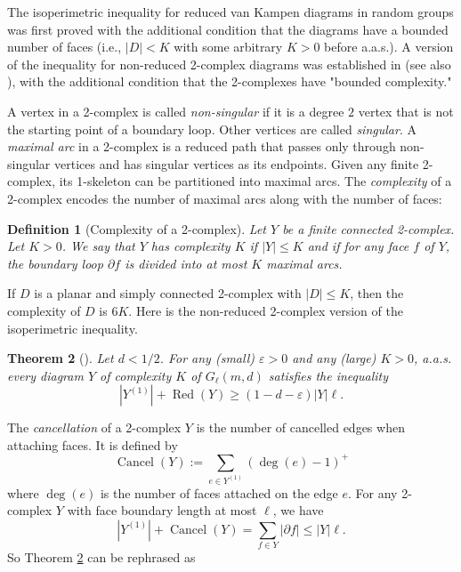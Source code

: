 \documentclass[a4paper]{article}
\DeclareMathOperator{\Red}{Red}
\DeclareMathOperator{\Cancel}{Cancel}
\DeclareMathOperator{\degg}{deg}
\newtheorem{thm}{Theorem}[section]
\newtheorem{defi}[thm]{Definition}
\theoremstyle{remark}
\begin{document}
\quad

The isoperimetric inequality for reduced van Kampen diagrams in random groups was first proved with the additional condition that the diagrams have a bounded number of faces (i.e., $|D|<K$ with some arbitrary $K>0$ before a.a.s.). A version of the inequality for non-reduced 2-complex diagrams was established in \cite{Tsa22b} (see also \cite{GM18}), with the additional condition that the 2-complexes have "bounded complexity."

A vertex in a 2-complex is called \textit{non-singular} if it is a degree $2$ vertex that is not the starting point of a boundary loop. Other vertices are called \textit{singular}. A \textit{maximal arc} in a 2-complex is a reduced path that passes only through non-singular vertices and has singular vertices as its endpoints. Given any finite 2-complex, its 1-skeleton can be partitioned into maximal arcs. The \textit{complexity} of a 2-complex encodes the number of maximal arcs along with the number of faces:

\begin{defi}[Complexity of a 2-complex]\label{complexity}
Let $Y$ be a finite connected 2-complex. Let $K>0$. We say that $Y$ has complexity $K$ if $|Y|\leq K$ and if for any face $f$ of $Y$, the boundary loop $\partial f$ is divided into at most $K$ maximal arcs.
\end{defi}


If $D$ is a planar and simply connected 2-complex with $|D|\leq K$, then the complexity of $D$ is $6K$. Here is the non-reduced 2-complex version of the isoperimetric inequality.

\begin{thm}[\cite{Tsa22b}] \label{inequality for 2-complex} Let $d<1/2$. For any (small) $\varepsilon>0$ and any (large) $K>0$, a.a.s. every diagram $Y$ of complexity $K$ of $G_\ell(m,d)$ satisfies the inequality 
\[|Y^{(1)}|+\Red(Y)\geq (1-d-\varepsilon)|Y|\ell.\]
\end{thm}

\quad

The \textit{cancellation} of a 2-complex $Y $ is the number of cancelled edges when attaching faces. It is defined by
\[\Cancel(Y):=\sum_{e\in Y^{(1)}}(\degg(e)-1)^+\]
where $\degg(e)$ is the number of faces attached on the edge $e$. For any 2-complex $Y$ with face boundary length at most $\ell$, we have
\[|Y^{(1)}|+\Cancel(Y) = \sum_{f\in Y}|\partial f|\leq |Y|\ell.\]
So Theorem \ref{inequality for 2-complex} can be rephrased as
\end{document}

